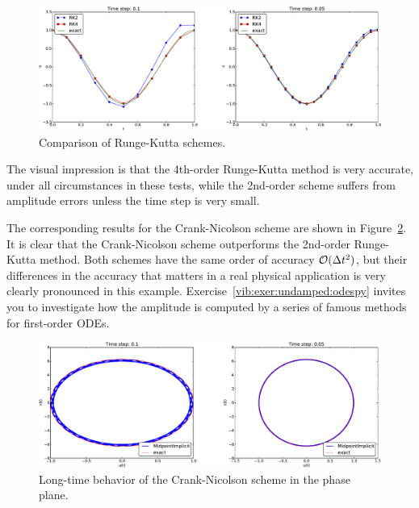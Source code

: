 \documentclass[%
oneside,                 %
final,                   %
10pt]{article}
\begin{document}
\begin{figure}[!ht]  %
  \centerline{\includegraphics[width=1.0\linewidth]{fig-vib/vib_RK_1_u.pdf}}
  \caption{
  Comparison of Runge-Kutta schemes. \label{vib:ode1:1st:odespy:RK}
  }
\end{figure}



The visual impression is that the
4th-order Runge-Kutta method is very accurate, under all circumstances
in these tests, while the 2nd-order scheme suffers from amplitude errors
unless the time step is very small.


The corresponding results for the Crank-Nicolson scheme are shown in
Figure~\ref{vib:ode1:1st:odespy:CN:long:phaseplane}.
It is clear that the Crank-Nicolson
scheme outperforms the 2nd-order Runge-Kutta method. Both schemes have
the same order of accuracy $\Oof{\Delta t^2}$, but their differences
in the accuracy that matters in a real physical application is very
clearly pronounced in this example.  Exercise~\ref{vib:exer:undamped:odespy} invites you to investigate how the amplitude
is computed by a series of famous methods for first-order ODEs.


\begin{figure}[!ht]  %
  \centerline{\includegraphics[width=1.0\linewidth]{fig-vib/vib_CN_10_pp.pdf}}
  \caption{
  Long-time behavior of the Crank-Nicolson scheme in the phase plane. \label{vib:ode1:1st:odespy:CN:long:phaseplane}
  }
\end{figure}
\end{document}

